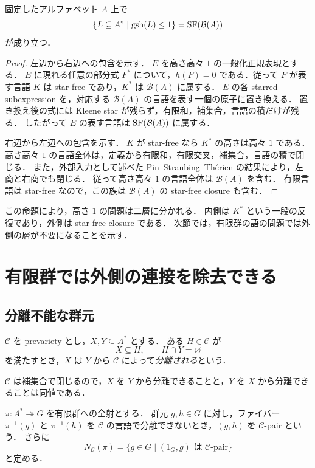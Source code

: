 \begin{proposition}[高さ一の平坦化]\label{prop:flattening}
固定したアルファベット $A$ 上で
\[
\{L\subseteq A^*\mid \operatorname{gsh}(L)\leq1\}=\operatorname{SF}(\mathcal B(A))
\]
が成り立つ．
\end{proposition}

\begin{proof}
左辺から右辺への包含を示す．
$E$ を高さ高々 $1$ の一般化正規表現とする．
$E$ に現れる任意の部分式 $F^*$ について，$h(F)=0$ である．従って $F$ が表す言語 $K$ は star-free であり，$K^*$ は $\mathcal B(A)$ に属する．
$E$ の各 starred subexpression を，対応する $\mathcal B(A)$ の言語を表す一個の原子に置き換える．
置き換え後の式には Kleene star が残らず，有限和，補集合，言語の積だけが残る．
したがって $E$ の表す言語は $\operatorname{SF}(\mathcal B(A))$ に属する．

右辺から左辺への包含を示す．
$K$ が star-free なら $K^*$ の高さは高々 $1$ である．
高さ高々 $1$ の言語全体は，定義から有限和，有限交叉，補集合，言語の積で閉じる．
また，外部入力として述べた Pin--Straubing--Th\'erien の結果により，左商と右商でも閉じる．
従って高さ高々 $1$ の言語全体は $\mathcal B(A)$ を含む．
有限言語は star-free なので，この族は $\mathcal B(A)$ の star-free closure も含む．
\end{proof}

この命題により，高さ $1$ の問題は二層に分かれる．
内側は $K^*$ という一段の反復であり，外側は star-free closure である．
次節では，有限群の語の問題では外側の層が不要になることを示す．

\section{有限群では外側の連接を除去できる}

\subsection{分離不能な群元}

\begin{definition}
$\mathcal C$ を prevariety とし，$X,Y\subseteq A^*$ とする．
ある $H\in\mathcal C$ が
\[
X\subseteq H,
\qquad
H\cap Y=\varnothing
\]
を満たすとき，$X$ は $Y$ から $\mathcal C$ によって\emph{分離される}という．
\end{definition}

$\mathcal C$ は補集合で閉じるので，$X$ を $Y$ から分離できることと，$Y$ を $X$ から分離できることは同値である．

\begin{definition}
$\pi:A^*\twoheadrightarrow G$ を有限群への全射とする．
群元 $g,h\in G$ に対し，ファイバー $\pi^{-1}(g)$ と $\pi^{-1}(h)$ を $\mathcal C$ の言語で分離できないとき，$(g,h)$ を $\mathcal C$-pair という．
さらに
\[
N_{\mathcal C}(\pi)=\{g\in G\mid (1_G,g)\text{ は }\mathcal C\text{-pair}\}
\]
と定める．
\end{definition}

